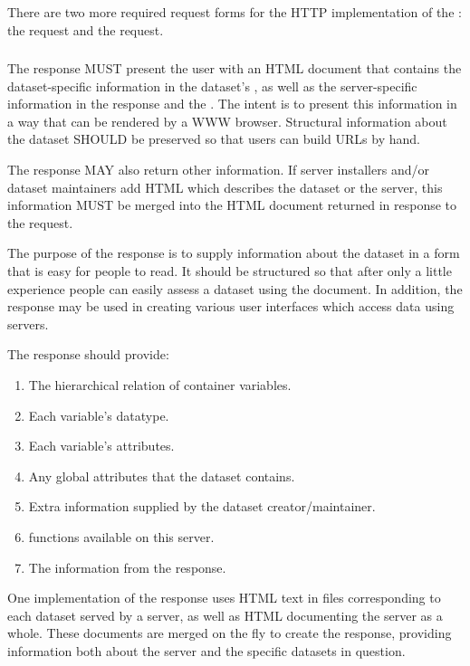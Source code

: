 \documentclass[justify]{dods-paper}
\begin{document}
There are two more required request forms for the HTTP implementation
of the \DAP: the \INFO request and the \HELP request.  

\subsubsection{\INFO}
\label{sec-info}

The \INFO response MUST present the user with an HTML document that
contains the dataset-specific information in the dataset's \DDX, as
well as the server-specific information in the \VER response and the
\CapX.  The intent is to present this information in a way that can be
rendered by a WWW browser.  Structural information about the dataset
SHOULD be preserved so that users can build \DAP URLs by hand.

The \INFO response MAY also return other information. If server
installers and/or dataset maintainers add HTML which describes the
dataset or the server, this information MUST be merged into the HTML
document returned in response to the \INFO request.

The purpose of the \INFO response is to supply information about the
dataset in a form that is easy for people to read. It should be
structured so that after only a little experience people can easily
assess a dataset using the document. In addition, the \INFO response
may be used in creating various user interfaces which access data
using \DAP servers.

The \INFO response should provide:

\begin{enumerate}
\item The hierarchical relation of container variables.
\item Each variable's datatype.
\item Each variable's attributes.
\item Any global attributes that the dataset contains.
\item Extra information supplied by the dataset creator/maintainer.
\item \CE functions available on this server.
\item The information from the \VER response.
\end{enumerate}

One implementation of the \INFO response uses HTML text in files
corresponding to each dataset served by a server, as well as HTML
documenting the server as a whole.  These documents are merged on the
fly to create the \INFO response, providing information both about the
server and the specific datasets in question.  
\end{document}
